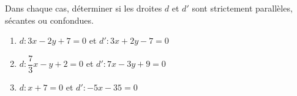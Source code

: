 \begin{exo}{}
	Dans chaque cas, déterminer si les droites $d$ et $d'$ sont strictement parallèles, sécantes ou confondues.
	\begin{enumerate}
		\item $d : 3x - 2y + 7 = 0$ et $d' : 3x + 2y - 7 = 0$
		\item $d : \dfrac{7}{3}x - y + 2 = 0$ et $d' : 7x - 3y + 9 = 0$
		\item $d : x + 7 = 0$ et $d' : -5x - 35 = 0$
	\end{enumerate}
\end{exo}
